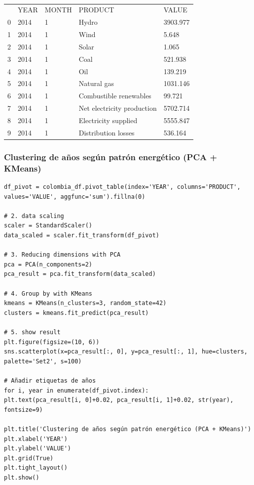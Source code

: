 \documentclass{article}
\begin{document}
{\tt
	\begin{tabular}{lllll}
		& YEAR & MONTH & PRODUCT                    & VALUE    \\
		0   & 2014 & 1     & Hydro                      & 3903.977 \\
		1   & 2014 & 1     & Wind                       & 5.648    \\
		2   & 2014 & 1     & Solar                      & 1.065    \\
		3   & 2014 & 1     & Coal                       & 521.938  \\
		4   & 2014 & 1     & Oil                        & 139.219  \\
		5   & 2014 & 1     & Natural gas                & 1031.146 \\
		6   & 2014 & 1     & Combustible renewables     & 99.721   \\
		7   & 2014 & 1     & Net electricity production & 5702.714 \\
		8   & 2014 & 1     & Electricity supplied       & 5555.847 \\
		9   & 2014 & 1     & Distribution losses        & 536.164 
	\end{tabular}
}

\subsubsection{Clustering de años según patrón energético (PCA + KMeans)}

\begin{verbatim}
df_pivot = colombia_df.pivot_table(index='YEAR', columns='PRODUCT', values='VALUE', aggfunc='sum').fillna(0)

# 2. data scaling
scaler = StandardScaler()
data_scaled = scaler.fit_transform(df_pivot)

# 3. Reducing dimensions with PCA
pca = PCA(n_components=2)
pca_result = pca.fit_transform(data_scaled)

# 4. Group by with KMeans
kmeans = KMeans(n_clusters=3, random_state=42)
clusters = kmeans.fit_predict(pca_result)

# 5. show result
plt.figure(figsize=(10, 6))
sns.scatterplot(x=pca_result[:, 0], y=pca_result[:, 1], hue=clusters, palette='Set2', s=100)

# Añadir etiquetas de años
for i, year in enumerate(df_pivot.index):
plt.text(pca_result[i, 0]+0.02, pca_result[i, 1]+0.02, str(year), fontsize=9)

plt.title('Clustering de años según patrón energético (PCA + KMeans)')
plt.xlabel('YEAR')
plt.ylabel('VALUE')
plt.grid(True)
plt.tight_layout()
plt.show()
\end{verbatim}
\end{document}
